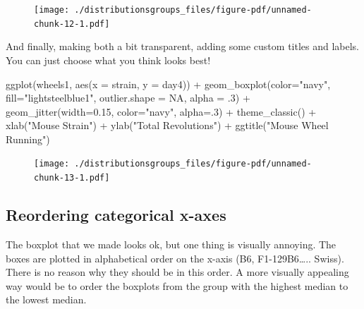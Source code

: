\documentclass[
  letterpaper,
  DIV=11,
  numbers=noendperiod]{scrreprt}
\newenvironment{Shaded}{\begin{snugshade}}{\end{snugshade}}
\newcommand{\AttributeTok}[1]{\textcolor[rgb]{0.40,0.45,0.13}{#1}}
\newcommand{\ConstantTok}[1]{\textcolor[rgb]{0.56,0.35,0.01}{#1}}
\newcommand{\DecValTok}[1]{\textcolor[rgb]{0.68,0.00,0.00}{#1}}
\newcommand{\FloatTok}[1]{\textcolor[rgb]{0.68,0.00,0.00}{#1}}
\newcommand{\FunctionTok}[1]{\textcolor[rgb]{0.28,0.35,0.67}{#1}}
\newcommand{\NormalTok}[1]{\textcolor[rgb]{0.00,0.23,0.31}{#1}}
\newcommand{\SpecialCharTok}[1]{\textcolor[rgb]{0.37,0.37,0.37}{#1}}
\newcommand{\StringTok}[1]{\textcolor[rgb]{0.13,0.47,0.30}{#1}}
\begin{document}
\begin{figure}[H]

{\centering \texttt{[image: ./distributionsgroups\_files/figure-pdf/unnamed-chunk-12-1.pdf]}

}

\end{figure}

And finally, making both a bit transparent, adding some custom titles
and labels. You can just choose what you think looks best!

\begin{Shaded}
\begin{Highlighting}[]
\FunctionTok{ggplot}\NormalTok{(wheels1, }\FunctionTok{aes}\NormalTok{(}\AttributeTok{x =}\NormalTok{ strain, }\AttributeTok{y =}\NormalTok{ day4)) }\SpecialCharTok{+} 
  \FunctionTok{geom\_boxplot}\NormalTok{(}\AttributeTok{color=}\StringTok{"navy"}\NormalTok{, }\AttributeTok{fill=}\StringTok{"lightsteelblue1"}\NormalTok{, }\AttributeTok{outlier.shape =} \ConstantTok{NA}\NormalTok{, }\AttributeTok{alpha =}\NormalTok{ .}\DecValTok{3}\NormalTok{) }\SpecialCharTok{+}
  \FunctionTok{geom\_jitter}\NormalTok{(}\AttributeTok{width=}\FloatTok{0.15}\NormalTok{, }\AttributeTok{color=}\StringTok{"navy"}\NormalTok{, }\AttributeTok{alpha=}\NormalTok{.}\DecValTok{3}\NormalTok{) }\SpecialCharTok{+}
  \FunctionTok{theme\_classic}\NormalTok{()  }\SpecialCharTok{+}
  \FunctionTok{xlab}\NormalTok{(}\StringTok{"Mouse Strain"}\NormalTok{) }\SpecialCharTok{+}
  \FunctionTok{ylab}\NormalTok{(}\StringTok{"Total Revolutions"}\NormalTok{) }\SpecialCharTok{+}
  \FunctionTok{ggtitle}\NormalTok{(}\StringTok{"Mouse Wheel Running"}\NormalTok{)}
\end{Highlighting}
\end{Shaded}

\begin{figure}[H]

{\centering \texttt{[image: ./distributionsgroups\_files/figure-pdf/unnamed-chunk-13-1.pdf]}

}

\end{figure}

\hypertarget{reordering-categorical-x-axes}{%
\subsection{Reordering categorical
x-axes}\label{reordering-categorical-x-axes}}

The boxplot that we made looks ok, but one thing is visually annoying.
The boxes are plotted in alphabetical order on the x-axis (B6,
F1-129B6\ldots.. Swiss). There is no reason why they should be in this
order. A more visually appealing way would be to order the boxplots from
the group with the highest median to the lowest median.
\end{document}
